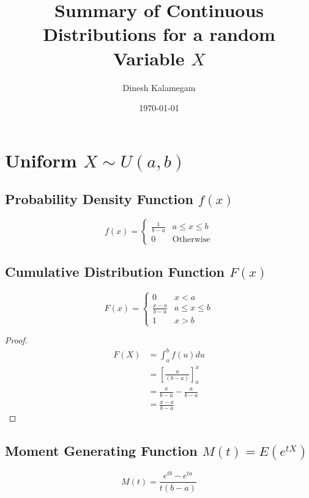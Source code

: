 \documentclass[12pt]{article}
\begin{document}
\title{Summary of Continuous Distributions for a random Variable $X$}
\author{Dinesh Kalamegam}
\date{\today}
\maketitle

\section{Uniform $X \sim U(a,b)$}
\subsection{Probability Density Function $f(x)$}

\begin{equation*}
  f(x) =
  \begin{cases}
     \frac{1}{b-a} & a \leq x \leq b \\
     0 & \text{Otherwise}
  \end{cases}
\end{equation*}

\subsection{Cumulative Distribution Function $F(x)$}

\begin{equation*}
  F(x) =
  \begin{cases}
     0 & x <a \\
     \frac{x-a}{b-a} & a \leq x \leq b \\
     1 & x>b
  \end{cases}
\end{equation*}

\begin{proof}
  \begin{align*}
    F(X) &= \int_{a}^{b} f(u) du \\
         &= \left[\frac{u}{(b-a)}\right]_{a}^{x} \\
         &= \frac{x}{b-a} - \frac{a}{b-a} \\
         &= \frac{x-a}{b-a}
  \end{align*}
\end{proof}
\subsection{Moment Generating Function $M(t)=E(e^{tX})$}

\begin{equation*}
    M(t)=\frac{e^{tb}-e^{ta}}{t(b-a)}
\end{equation*}
\end{document}
